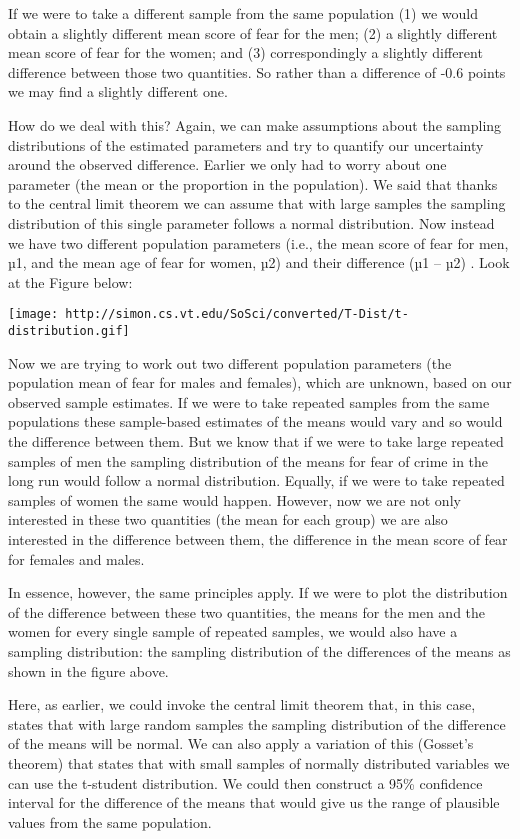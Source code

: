 \documentclass[
]{book}
\begin{document}
If we were to take a different sample from the same population (1) we would obtain a slightly different mean score of fear for the men; (2) a slightly different mean score of fear for the women; and (3) correspondingly a slightly different difference between those two quantities. So rather than a difference of -0.6 points we may find a slightly different one.

How do we deal with this? Again, we can make assumptions about the sampling distributions of the estimated parameters and try to quantify our uncertainty around the observed difference. Earlier we only had to worry about one parameter (the mean or the proportion in the population). We said that thanks to the central limit theorem we can assume that with large samples the sampling distribution of this single parameter follows a normal distribution. Now instead we have two different population parameters (i.e., the mean score of fear for men, µ1, and the mean age of fear for women, µ2) and their difference (µ1 -- µ2) . Look at the Figure below:

\texttt{[image: http://simon.cs.vt.edu/SoSci/converted/T-Dist/t-distribution.gif]}

Now we are trying to work out two different population parameters (the population mean of fear for males and females), which are unknown, based on our observed sample estimates. If we were to take repeated samples from the same populations these sample-based estimates of the means would vary and so would the difference between them. But we know that if we were to take large repeated samples of men the sampling distribution of the means for fear of crime in the long run would follow a normal distribution. Equally, if we were to take repeated samples of women the same would happen. However, now we are not only interested in these two quantities (the mean for each group) we are also interested in the difference between them, the difference in the mean score of fear for females and males.

In essence, however, the same principles apply. If we were to plot the distribution of the difference between these two quantities, the means for the men and the women for every single sample of repeated samples, we would also have a sampling distribution: the sampling distribution of the differences of the means as shown in the figure above.

Here, as earlier, we could invoke the central limit theorem that, in this case, states that with large random samples the sampling distribution of the difference of the means will be normal. We can also apply a variation of this (Gosset's theorem) that states that with small samples of normally distributed variables we can use the t-student distribution. We could then construct a 95\% confidence interval for the difference of the means that would give us the range of plausible values from the same population.
\end{document}

